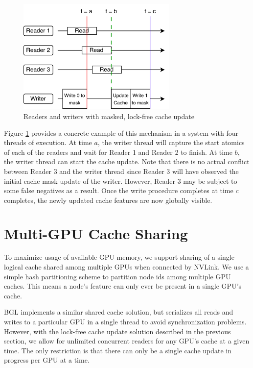 \begin{figure}[h!]
    \centering
    \includegraphics[width=0.7\textwidth]{diagrams/group_meeting_gnn-Multi-GPU.png}
    
    \caption{Readers and writers with masked, lock-free cache update}
    \label{Design: Lock-free update diagram}
\end{figure}    
Figure \ref{Design: Lock-free update diagram} provides a concrete example of this mechanism in a system with four threads of execution. At time $a$, the writer thread will capture the start atomics of each of the readers and wait for Reader 1 and Reader 2 to finish. At time $b$, the writer thread can start the cache update. Note that there is no actual conflict between Reader 3 and the writer thread since Reader 3 will have observed the initial cache mask update of the writer. However, Reader 3 may be subject to some false negatives as a result. Once the write procedure completes at time $c$ completes, the newly updated cache features are now globally visible.

\section{Multi-GPU Cache Sharing} \label{Design: Multi-GPU}
To maximize usage of available GPU memory, we support sharing of a single logical cache shared among multiple GPUs when connected by NVLink.
We use a simple hash partitioning scheme to partition node ids among multiple GPU caches. This means a node's feature can only ever be present in a single GPU's cache.

BGL implements a similar shared cache solution, but serializes all reads and writes to a particular GPU in a single thread to avoid synchronization problems. However, with the lock-free cache update solution described in the previous section, we allow for unlimited concurrent readers for any GPU's cache at a given time. The only restriction is that there can only be a single cache update in progress per GPU at a time.

